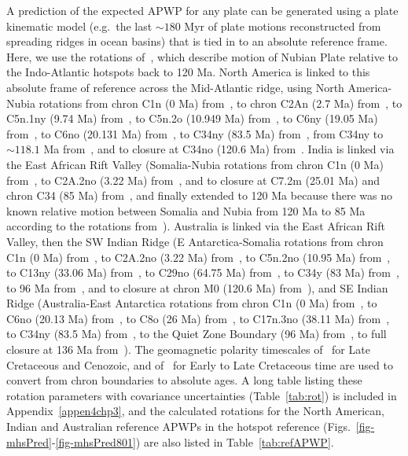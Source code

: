 A prediction of the expected APWP for any plate can be generated using a plate
kinematic model (e.g.\ the last ${\sim}180$ Myr of plate motions
reconstructed from spreading ridges in ocean basins) that is tied in to an
absolute reference frame. Here, we use the rotations of~\citet{O05}, which
describe motion of Nubian Plate relative to the Indo-Atlantic hotspots back to
120 Ma. North America is linked to this absolute frame of reference across the
Mid-Atlantic ridge, using North America-Nubia rotations from chron C1n
(0 Ma) from~\citet{D10}, to chron C2An (2.7 Ma)
from~\citet{Sh12}, to C5n.1ny (9.74 Ma) from~\citet{M99}, to C5n.2o (10.949 Ma)
from~\citet{G13}, to C6ny (19.05 Ma) from~\citet{M99}, to C6no (20.131 Ma)
from~\citet{G13}, to C34ny (83.5 Ma) from~\citet{M99}, from C34ny to
${\sim}118.1$ Ma from~\citet{S12}, and to closure at C34no (120.6 Ma)
from~\citet{G13}. India is linked via the East African Rift Valley
(Somalia-Nubia rotations from chron C1n (0 Ma) from~\citet{D17},
to C2A.2no (3.22 Ma) from~\citet{H05}, and to closure at C7.2m (25.01 Ma) and
chron C34 (85 Ma) from~\citet{R16}, and finally extended to 120 Ma because there
was no known relative motion between Somalia and Nubia from 120 Ma to 85 Ma
according to the rotations from~\citet{M16}). Australia is linked via the East
African Rift Valley, then the SW Indian Ridge (E Antarctica-Somalia rotations
from chron C1n (0 Ma) from~\citet{D17}, to C2A.2no (3.22 Ma)
from~\citet{H05}, to C5n.2no (10.95 Ma) from~\citet{L02}, to C13ny (33.06 Ma)
from~\citet{P08}, to C29no (64.75 Ma) from~\citet{C10}, to C34y (83 Ma)
from~\citet{R16}, to 96 Ma from~\citet{M01}, and to closure at chron M0 (120.6
Ma) from~\citet{M08}), and SE Indian Ridge (Australia-East Antarctica rotations
from chron C1n (0 Ma) from~\citet{D17}, to C6no (20.13 Ma)
from~\citet{C04}, to C8o (26 Ma) from~\citet{G18}, to C17n.3no (38.11 Ma)
from~\citet{C04}, to C34ny (83.5 Ma) from~\citet{Wh13}, to the Quiet Zone
Boundary (96 Ma) from~\citet{W07}, to full closure at 136 Ma from~\citet{Wh13}).
The geomagnetic polarity timescales of~\citet{C95} for Late Cretaceous and
Cenozoic, and of~\citet{Gr94} for Early to Late Cretaceous time are used to
convert from chron boundaries to absolute ages. A long table listing these
rotation parameters with covariance uncertainties (Table~\ref{tab:rot}) is
included in Appendix~\ref{appen4chp3}, and the calculated rotations for the
North American, Indian and Australian reference APWPs in the hotspot reference
(Figs.~\ref{fig-mhsPred}-\ref{fig-mhsPred801}) are also listed in
Table~\ref{tab:refAPWP}.

